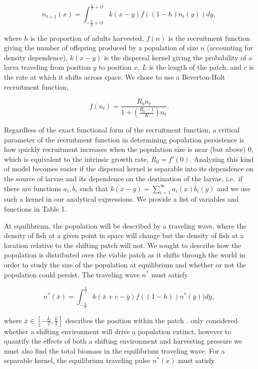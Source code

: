 \documentclass[12pt,english]{article}
\begin{document}
\begin{equation}
n_{t+1}(x)=\int^{\frac{L}{2}+ct}_{-\frac{L}{2}+ct}k(x-y)f((1-h)n_t(y))dy \label{integrodifference},
\end{equation}

\noindent where $h$ is the proportion of adults harvested, $f(n)$ is the recruitment function giving the number of 
offspring produced by a population of size $n$ (accounting for density dependence), $k(x-y)$ is the dispersal kernel giving the probability of a  larva traveling from position $y$ to position $x$, $L$ is the length of the patch, and $c$ is the rate at which it  shifts across space.  We chose to use a Beverton-Holt recruitment function,

\[f(n_t)=\frac{R_0n_t}{1+\left(\frac{R_0-1}{K}\right)n_t}.\]  

\noindent Regardless of the exact functional form of the recruitment function, a critical parameter of the recruitment function in determining population persistence is how quickly recruitment increases when the population 
size is near (but above) $0$, which is equivalent to the intrinsic growth rate, $R_0=f'(0)$.  Analyzing this kind of model becomes easier if the dispersal kernel is separable into its dependence on the source of larvae and its dependence on the destination of the larvae, i.e.~if there are functions $a_i, b_i$ such that $k(x- y) = \sum^\infty_{i=1} a_i(x)b_i(y)$ and we use such a kernel in our analytical expressions. We provide a list of variables and functions in Table 1. 

At equilibrium, the population will be described by a traveling wave, 
where the density of fish at a given point in space will change but the density of fish at a location relative to the 
shifting  patch will not. We sought to describe how the population is distributed over the viable 
patch as it shifts through the world in order to study the size of the population at equilibrium and whether or not the population could persist.  The traveling wave $n^*$ must 
satisfy

\begin{equation}
n^*(\bar{x})=\int^{\frac{L}{2}}_{-\frac{L}{2}}k(\bar{x}+c-\bar{y})f((1-h))n^*(\bar{y}))d
\bar{y}, \label{traveling_pulse}
\end{equation}

\noindent where $\bar{x}\in\left[-\frac{L}{2}, \frac{L}{2}\right]$ describes the position within the patch \citep{ZhouKot2011}. \citet{ZhouKot2011} only considered whether a shifting environment will drive a population extinct, however to quantify the effects of both a shifting environment and harvesting pressure we must also find the total biomass in the equilibrium traveling wave.  For a separable kernel, the equilibrium traveling pulse $n^*(x)$ must satisfy 
\end{document}
